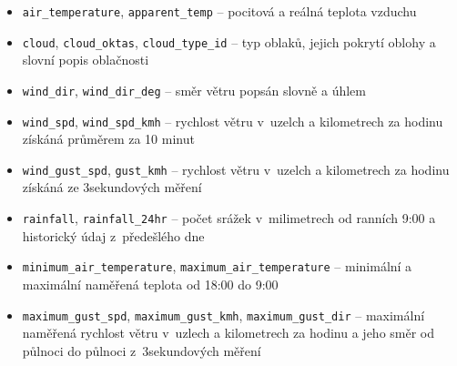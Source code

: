 \documentclass[10pt,a4paper,titlepage]{extarticle}
\begin{document}
\begin{itemize}
\begin{itemize}[label=\textperiodcentered]
        \item \texttt{air\_temperature}, \texttt{apparent\_temp} -- pocitová a reálná teplota vzduchu
        \item \texttt{cloud}, \texttt{cloud\_oktas}, \texttt{cloud\_type\_id} -- typ oblaků, jejich pokrytí oblohy a slovní popis oblačnosti
        \item \texttt{wind\_dir}, \texttt{wind\_dir\_deg} -- směr větru popsán slovně a úhlem 
        \item \texttt{wind\_spd}, \texttt{wind\_spd\_kmh} -- rychlost větru v~uzelch a kilometrech za hodinu získáná průměrem za 10 minut
        \item \texttt{wind\_gust\_spd}, \texttt{gust\_kmh} -- rychlost větru v~uzelch a kilometrech za hodinu získáná
        ze 3sekundových měření
        \item \texttt{rainfall}, \texttt{rainfall\_24hr} -- počet srážek v~milimetrech od ranních 9:00 a historický
        údaj z~předešlého dne
        \item \texttt{minimum\_air\_temperature}, \texttt{maximum\_air\_temperature} -- minimální a maximální naměřená teplota od 18:00 do 9:00
        \item \texttt{maximum\_gust\_spd}, \texttt{maximum\_gust\_kmh}, \texttt{maximum\_gust\_dir} -- maximální
        naměřená rychlost větru v~uzlech a kilometrech za hodinu a jeho směr od půlnoci do půlnoci z~3sekundových měření
    \end{itemize}
\end{itemize}
\end{document}
